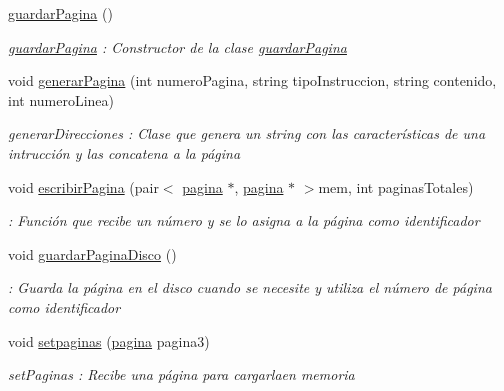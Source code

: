 \begin{DoxyCompactItemize}
\item 
\hyperlink{classguardar_pagina_a3b970b12d4a000ae41f7049fc53bfa0b}{guardar\+Pagina} ()\hypertarget{classguardar_pagina_a3b970b12d4a000ae41f7049fc53bfa0b}{}\label{classguardar_pagina_a3b970b12d4a000ae41f7049fc53bfa0b}

\begin{DoxyCompactList}\small\item\em \hyperlink{classguardar_pagina}{guardar\+Pagina} \+: Constructor de la clase \hyperlink{classguardar_pagina}{guardar\+Pagina} \end{DoxyCompactList}\item 
void \hyperlink{classguardar_pagina_a344328cea47595c25a7ecb18dfed2a57}{generar\+Pagina} (int numero\+Pagina, string tipo\+Instruccion, string contenido, int numero\+Linea)
\begin{DoxyCompactList}\small\item\em generar\+Direcciones \+: Clase que genera un string con las características de una intrucción y las concatena a la página \end{DoxyCompactList}\item 
void \hyperlink{classguardar_pagina_a7399539ba987f68a059938f432895852}{escribir\+Pagina} (pair$<$ \hyperlink{classpagina}{pagina} $\ast$, \hyperlink{classpagina}{pagina} $\ast$ $>$mem, int paginas\+Totales)
\begin{DoxyCompactList}\small\item\em \+: Función que recibe un número y se lo asigna a la página como identificador \end{DoxyCompactList}\item 
void \hyperlink{classguardar_pagina_a02c9e3e2eebca935f1aafe8afc334af3}{guardar\+Pagina\+Disco} ()\hypertarget{classguardar_pagina_a02c9e3e2eebca935f1aafe8afc334af3}{}\label{classguardar_pagina_a02c9e3e2eebca935f1aafe8afc334af3}

\begin{DoxyCompactList}\small\item\em \+: Guarda la página en el disco cuando se necesite y utiliza el número de página como identificador \end{DoxyCompactList}\item 
void \hyperlink{classguardar_pagina_a1ff90c2e180bb016f6406591aed2189a}{setpaginas} (\hyperlink{classpagina}{pagina} pagina3)
\begin{DoxyCompactList}\small\item\em set\+Paginas \+: Recibe una página para cargarlaen memoria \end{DoxyCompactList}\end{DoxyCompactItemize}


